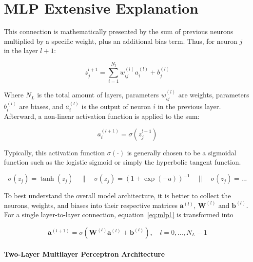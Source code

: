 \chapter{MLP Extensive Explanation} \label{ch:appendix_mlp}

This connection is mathematically presented by the sum of previous neurons multiplied by a specific weight, plus an additional bias term. Thus, for neuron $j$ in the layer $l + 1$: 

\begin{equation}~\label{eq:mlp1}
    z_j^{l+1} = \sum_{i=1}^{N_l} w_{ij}^{(l)} a_i^{(l)} + b_j^{(l)}
\end{equation}

Where $N_L$ is the total amount of layers, parameters $w_{ij}^{(l)}$ are weights, parameters $b_i^{(l)}$ are biases, and $a_i^{(l)}$ is the output of neuron $i$ in the previous layer. Afterward, a non-linear activation function is applied to the sum:

\begin{equation}~\label{eq:mlp2}
    a_i^{(l+1)} = \sigma ( z_j^{l+1} )
\end{equation}

Typically, this activation function $\sigma (\cdot)$ is generally chosen to be a sigmoidal function such as the logistic sigmoid or simply the hyperbolic tangent function.

\begin{equation}~\label{eq:mlp3}
    \sigma (z_j) = \tanh (z_j) \quad \| \quad
    \sigma(z_j) = (1 + \exp{(-a)})^{-1}  \quad \| \quad
    \sigma(z_j) = \ldots
\end{equation}

To best understand the overall model architecture, it is better to collect the neurons, weights, and biases into their respective matrices $\textbf{a}^(l)$, $\textbf{W}^(l)$ and $\textbf{b}^(l)$. For a single layer-to-layer connection, equation~\ref{eq:mlp1} is transformed into

\begin{equation}~\label{eq:mlp4}
    \textbf{a}^(l+1) = \sigma \left( \textbf{W}^(l) \textbf{a}^(l) + \textbf{b}^(l)  \right), \quad l = 0, \ldots, N_L - 1
\end{equation}

\subsubsection{Two-Layer Multilayer Perceptron Architecture}

